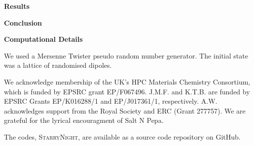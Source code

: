 \documentclass[journal=jacsat,manuscript=communication]{achemso}
\begin{document}
\textbf{Results}

\textbf{Conclusion}

\textbf{Computational Details}

We used a Mersenne Twister\cite{matsumoto_mersenne_1998} pseudo random number generator. The initial state was a lattice of randomised dipoles.


\begin{acknowledgement}
We acknowledge membership of the UK's HPC Materials Chemistry Consortium, which is funded by EPSRC grant EP/F067496. 
J.M.F. and K.T.B. are funded by EPSRC Grants EP/K016288/1 and EP/J017361/1, respectively.
A.W. acknowledges support from the Royal Society and ERC (Grant 277757). 
We are grateful for the lyrical encouragment of Salt N Pepa. 
\end{acknowledgement}

\begin{suppinfo}
    The codes, \textsc{StarryNight}, are available as a source code repository on GitHub\cite{GitHub}.
\end{suppinfo}


\end{document}
